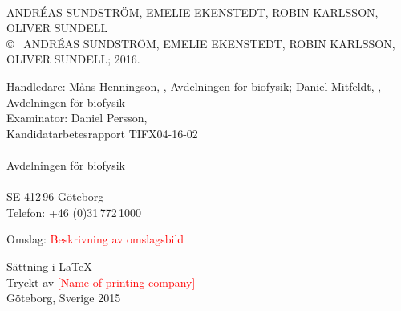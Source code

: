 \begin{flushleft}

\vspace*{4.5cm}
\titel\\
\undertitel

ANDRÉAS SUNDSTRÖM, EMELIE EKENSTEDT, ROBIN KARLSSON, OLIVER SUNDELL \\[1cm]

\copyright ~ ANDRÉAS SUNDSTRÖM, EMELIE EKENSTEDT, ROBIN KARLSSON, OLIVER SUNDELL; 2016. 
\setlength{\parskip}{1cm}


Handledare: Måns Henningson, \institution, Avdelningen för biofysik;  Daniel Mitfeldt, \institution, Avdelningen för biofysik\\
Examinator: Daniel Persson, \institution
\\[1cm]

Kandidatarbetesrapport TIFX04-16-02\\	%
\institution\\
Avdelningen för biofysik\\
\skola\\
SE-412\,96 Göteborg\\
Telefon: +46 (0)31\,772\,1000 
\setlength{\parskip}{0.5cm}

\vfill
Omslag: \textcolor{red}{Beskrivning av omslagsbild}
\setlength{\parskip}{0.5cm}

Sättning i \LaTeX \\
Tryckt av \textcolor{red}{[Name of printing company]}\\
Göteborg, Sverige 2015

\end{flushleft}


\setcounter{footnote}{0} 




\newpage
\thispagestyle{plain}
\begin{abstract}


\end{abstract}


